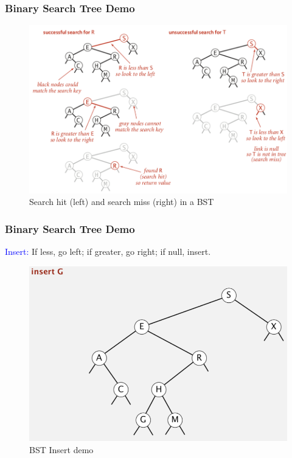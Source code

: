 \documentclass[11pt]{beamer}
\begin{document}
     \begin{frame}[fragile]
    	\frametitle{Binary Search Tree Demo}
        \begin{figure}
        	\centering
        	\includegraphics[width=0.9\linewidth]{"Screenshot 2020-11-02 at 12.20.42 PM"}
        	\caption{Search hit (left) and search miss (right) in a BST}
        	\label{fig:screenshot-2020-11-02-at-12}
        \end{figure}
          
    \end{frame}
    
    \begin{frame}[fragile]
    	\frametitle{Binary Search Tree Demo}
    	\textcolor{blue}{Insert: }If less, go left; if greater, go right; if null, insert.
    	\begin{figure}
    		\centering
    		\includegraphics[width=0.9\linewidth]{"Screenshot 2020-11-02 at 10.58.51 AM"}
    		\caption{BST Insert demo}
    		\label{fig:screenshot-2020-11-02-at-10}
    	\end{figure}	
    \end{frame}
\end{document}
